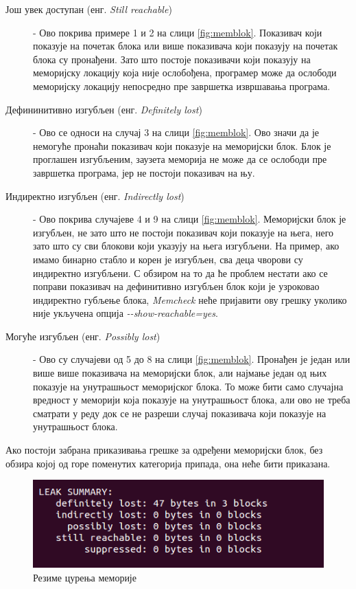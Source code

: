 \documentclass[12pt,oneside]{memoir}
\begin{document}
\begin{description}
  \item[Још увек доступан (енг. \textit{Still reachable}) ] - Ово покрива примере 1 и 2 на слици \ref{fig:memblok}. Показивач који показује на почетак блока или више показивача који показују на почетак блока су пронађени. Зато што постоје показивачи који показују на меморијску локацију која није ослобођена, програмер може да ослободи меморијску локацију непосредно пре завршетка извршавања програма.
  \item [Дефининитивно изгубљен (енг. \textit{Definitely lost})] - Ово се односи на случај 3 на слици \ref{fig:memblok}. Ово значи да је немогуће пронаћи показивач који показује на меморијски блок. Блок је проглашен изгубљеним, заузета меморија не може да се ослободи пре завршетка програма, јер не постоји показивач на њу.
  \item [Индиректно изгубљен (енг. \textit{Indirectly lost})] - Ово покрива случајеве 4 и 9 на слици \ref{fig:memblok}. Меморијски блок је изгубљен, не зато што не постоји показивач који показује на њега, него зато што су сви блокови који указују на њега изгубљени. На пример, ако имамо бинарно стабло и корен је изгубљен, сва деца чворови су индиректно изгубљени. С обзиром на то да ће проблем нестати ако се поправи показивач на дефинитивно изгубљен блок који је узроковао индиректно губљење блока, \textit{Memcheck} неће пријавити ову грешку уколико није укључена опција \textit{-\--show-reachable=yes}.
  \item [Могуће изгубљен (енг. \textit{Possibly lost})] - Ово су случајеви од 5 до 8 на слици \ref{fig:memblok}. Пронађен је један или више више показивача на меморијски блок,  али најмање један од њих показује на унутрашњост меморијског блока. То може бити само случајна вредност у меморији која показује на унутрашњост блока, али ово не треба сматрати у реду док се не разреши случај показивача који показује на унутрашњост блока.
\end{description}

\indent Ако постоји забрана приказивања грешке за одређени меморијски блок, без обзира којој од горе поменутих категорија припада, она неће бити приказана.

\begin{figure}[h!]
\begin{center}
\includegraphics[scale=0.75]{slika8.png}
\end{center}
\caption{Резиме цурења меморије}
\label{fig:memcurenje}
\end{figure}
\end{document}
